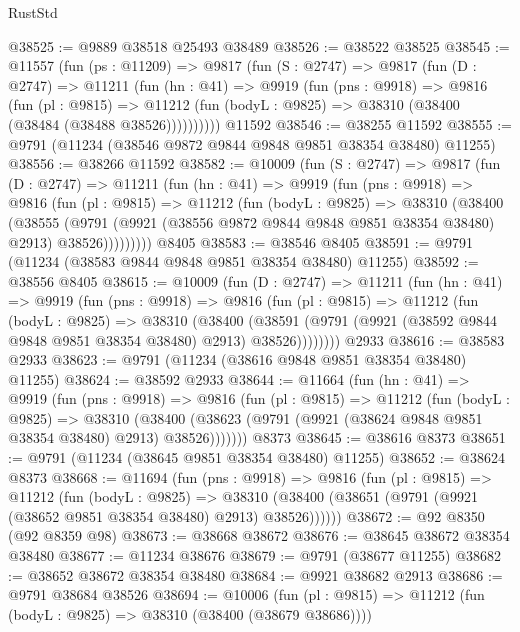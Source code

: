 \begin{lexlean}{RustStd}
\begin{coremodule}
@38525 := @9889 @38518 @25493 @38489
@38526 := @38522 @38525
@38545 := @11557
    (fun (ps : @11209) =>
    @9817
      (fun (S : @2747) =>
      @9817
        (fun (D : @2747) =>
        @11211
          (fun (hn : @41) =>
          @9919
            (fun (pns : @9918) =>
            @9816
              (fun (pl : @9815) =>
              @11212 (fun (bodyL : @9825) => @38310 (@38400 (@38484 (@38488 @38526))))))))))
    @11592
@38546 := @38255 @11592
@38555 := @9791 (@11234 (@38546 @9872 @9844 @9848 @9851 @38354 @38480) @11255)
@38556 := @38266 @11592
@38582 := @10009
    (fun (S : @2747) =>
    @9817
      (fun (D : @2747) =>
      @11211
        (fun (hn : @41) =>
        @9919
          (fun (pns : @9918) =>
          @9816
            (fun (pl : @9815) =>
            @11212
              (fun (bodyL : @9825) =>
              @38310
                (@38400
                  (@38555
                    (@9791
                      (@9921 (@38556 @9872 @9844 @9848 @9851 @38354 @38480) @2913)
                      @38526)))))))))
    @8405
@38583 := @38546 @8405
@38591 := @9791 (@11234 (@38583 @9844 @9848 @9851 @38354 @38480) @11255)
@38592 := @38556 @8405
@38615 := @10009
    (fun (D : @2747) =>
    @11211
      (fun (hn : @41) =>
      @9919
        (fun (pns : @9918) =>
        @9816
          (fun (pl : @9815) =>
          @11212
            (fun (bodyL : @9825) =>
            @38310
              (@38400
                (@38591 (@9791 (@9921 (@38592 @9844 @9848 @9851 @38354 @38480) @2913) @38526))))))))
    @2933
@38616 := @38583 @2933
@38623 := @9791 (@11234 (@38616 @9848 @9851 @38354 @38480) @11255)
@38624 := @38592 @2933
@38644 := @11664
    (fun (hn : @41) =>
    @9919
      (fun (pns : @9918) =>
      @9816
        (fun (pl : @9815) =>
        @11212
          (fun (bodyL : @9825) =>
          @38310
            (@38400 (@38623 (@9791 (@9921 (@38624 @9848 @9851 @38354 @38480) @2913) @38526)))))))
    @8373
@38645 := @38616 @8373
@38651 := @9791 (@11234 (@38645 @9851 @38354 @38480) @11255)
@38652 := @38624 @8373
@38668 := @11694
    (fun (pns : @9918) =>
    @9816
      (fun (pl : @9815) =>
      @11212
        (fun (bodyL : @9825) =>
        @38310 (@38400 (@38651 (@9791 (@9921 (@38652 @9851 @38354 @38480) @2913) @38526))))))
@38672 := @92 @8350 (@92 @8359 @98)
@38673 := @38668 @38672
@38676 := @38645 @38672 @38354 @38480
@38677 := @11234 @38676
@38679 := @9791 (@38677 @11255)
@38682 := @38652 @38672 @38354 @38480
@38684 := @9921 @38682 @2913
@38686 := @9791 @38684 @38526
@38694 := @10006
    (fun (pl : @9815) => @11212 (fun (bodyL : @9825) => @38310 (@38400 (@38679 @38686))))

\end{coremodule}
\end{lexlean}
